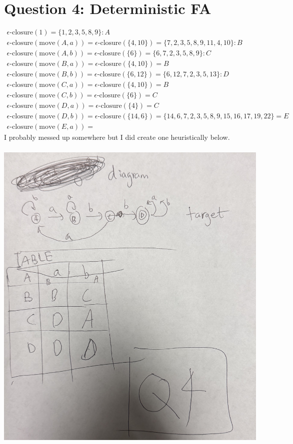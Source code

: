 \documentclass{article}
\begin{document}
\section*{Question 4: Deterministic FA}
\begin{align}
	\epsilon\text{-closure}(1)=\{1,2,3,5,8,9\}:A
	\\
	\epsilon\text{-closure}(\text{move}(A,a))=\epsilon\text{-closure}(\{4,10\})=\{7,2,3,5,8,9,11,4,10\}:B
	\\
	\epsilon\text{-closure}(\text{move}(A,b))=\epsilon\text{-closure}(\{6\})=\{6,7,2,3,5,8,9\}:C
	\\
	\epsilon\text{-closure}(\text{move}(B,a))=\epsilon\text{-closure}(\{4, 10\})=B
	\\
	\epsilon\text{-closure}(\text{move}(B,b))=\epsilon\text{-closure}(\{6,12\})=\{6,12,7,2,3,5,13\}:D
	\\
	\epsilon\text{-closure}(\text{move}(C,a))=\epsilon\text{-closure}(\{4,10\})=B
	\\
	\epsilon\text{-closure}(\text{move}(C,b))=\epsilon\text{-closure}(\{6\})=C
	\\
	\epsilon\text{-closure}(\text{move}(D,a))=\epsilon\text{-closure}(\{4\})=C
	\\
	\epsilon\text{-closure}(\text{move}(D,b))=\epsilon\text{-closure}(\{14,6\})=\{14,6,7,2,3,5,8,9,15,16,17,19,22\}=E
	\\
	\epsilon\text{-closure}(\text{move}(E,a))=
\end{align}
I probably messed up somewhere but I did create one heuristically below.
\\\\
\includegraphics[angle=-90,width=\textwidth]{DFA}
\end{document}
